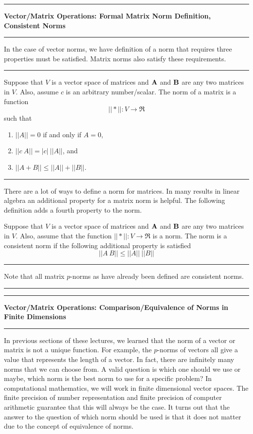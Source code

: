 \documentclass[10pt,fleqn]{article}
\begin{document}
\vskip0.1in\hrule\vskip0.1in
\noindent
{\bf Vector/Matrix Operations: Formal Matrix Norm Definition, Consistent Norms}
\vskip0.1in\hrule\vskip0.1in
\noindent
In the case of vector norms, we have definition of a norm that requires three
properties must be satisfied. Matrix norms also satisfy these requirements.
\vskip0.1in\hrule\vskip0.1in
\begin{definition}
   Suppose that $V$ is a vector space of matrices and ${\bf A}$ and ${\bf B}$
   are any two matrices in $V$. Also, assume $c$ is an arbitrary number/scalar.
   The norm of a matrix is a function
   $$
     || * || : V \rightarrow \Re
   $$
   such that
   \begin{enumerate}
     \item $||A||=0$ if and only if $A = 0$,
     \item $||c\ A|| = |c|\ ||A||$, and
     \item $||A + B || \leq ||A|| + ||B||$.
   \end{enumerate}
\end{definition}
\vskip0.1in\hrule\vskip0.1in
There are a lot of ways to define a norm for matrices. In many results in linear
algebra an additional property for a matrix norm is helpful. The following
definition adds a fourth property to the norm.
\begin{definition}
   Suppose that $V$ is a vector space of matrices and ${\bf A}$ and ${\bf B}$
   are any two matrices in $V$. Also, assume that the function
   $|| * || : V \rightarrow \Re$ is a norm. The norm is a consistent norm if the
   following additional property is satisfied
   $$
     || A\ B || \leq || A ||\ || B ||
   $$
\end{definition}
\vskip0.1in\hrule\vskip0.1in
\noindent
Note that all matrix $p$-norms as have already been defined are consistent
norms.
\vskip0.1in\hrule\vskip0.1in
\newpage
\vskip0.1in\hrule\vskip0.1in
\noindent
{\bf Vector/Matrix Operations: Comparison/Equivalence of Norms in Finite
Dimensions}
\vskip0.1in\hrule\vskip0.1in
\noindent
In previous sections of these lectures, we learned that the norm of a vector or
matrix is not a unique function. For example, the $p$-norms of vectors all give
a value that represents the length of a vector. In fact, there are infinitely
many norms that we can choose from. A valid question is which one should we use
or maybe, which norm is the best norm to use for a specific problem? In
computational mathematics, we will work in finite dimensional vector spaces. The
finite precision of number representation and finite precision of computer
arithmetic guarantee that this will always be the case. It turns out that the
answer to the question of which norm should be used is that it does not matter
due to the concept of equivalence of norms.
\end{document}
